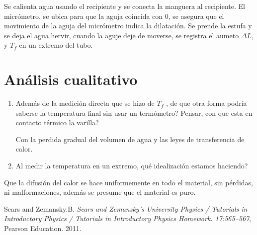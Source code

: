 \documentclass[DIV=calc, paper=a4, fontsize=11pt, twocolumn, spanish]{scrartcl}	 %
\begin{document}
Se calienta agua usando el recipiente y se conecta la manguera al recipiente. El micrómetro, se ubica para que la aguja coincida con 0, se asegura que el movimiento de la aguja del micrómetro indica la dilatación. Se prende la estufa y se deja el agua hervir, cuando la aguje deje de moverse, se registra el aumeto $\Delta L$, y $T_f$ en un extremo del tubo.

\section*{Análisis cualitativo}

\begin{enumerate}
\item Además de la medición directa que se hizo de $T_f$ , de que otra forma podría saberse la temperatura final sin usar un termómetro? Pensar, con que esta en contacto térmico la varilla?

Con la perdida gradual del volumen de agua y las leyes de transferencia de calor.

\item Al medir la temperatura en un extremo, qué idealización estamos haciendo?
\end{enumerate}

Que la difusión del calor se hace uniformemente en todo el material, sin pérdidas, ni malformaciones, además se presume que el material es puro.




\begin{thebibliography}{99} %

   Sears and Zemansky.B. {\em Sears and Zemansky's University Physics / Tutorials in Introductory Physics / Tutorials in Introductory Physics Homework. 17:565--567}, Pearson Education.  2011.
 
\end{thebibliography}

\end{document}
